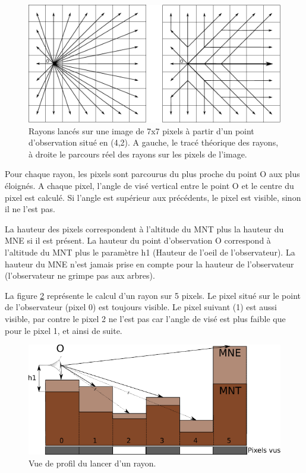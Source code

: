 \documentclass{report}
\begin{document}
\begin{figure}[H]
	\includegraphics[scale=0.8]{img/grid.pdf} 
	\caption{Rayons lancés sur une image de 7x7 pixels à partir d'un point d'observation situé en (4,2). A gauche, le tracé théorique des rayons, à droite le parcours réel des rayons sur les pixels de l'image.}
	\label{grid}
\end{figure}

Pour chaque rayon, les pixels sont parcourus du plus proche du point O aux plus éloignés. A chaque pixel, l'angle de visé vertical entre le point O et le centre du pixel est calculé. Si l'angle est supérieur aux précédents, le pixel est visible, sinon il ne l'est pas. 

La hauteur des pixels correspondent à l'altitude du MNT plus la hauteur du MNE si il est présent. La hauteur du point d'observation O correspond à l'altitude du MNT plus le paramètre h1 (Hauteur de l'oeil de l'observateur). La hauteur du MNE n'est jamais prise en compte pour la hauteur de l'observateur (l'observateur ne grimpe pas aux arbres).

La figure \ref{ray_side} représente le calcul d'un rayon sur 5 pixels. Le pixel situé sur le point de l'observateur (pixel 0) est toujours visible. Le pixel suivant (1) est aussi visible, par contre le pixel 2 ne l'est pas car l'angle de visé est plus faible que pour le pixel 1, et ainsi de suite.

\begin{figure}[H]
	\includegraphics{img/ray_side-fr.pdf} 
	\caption{Vue de profil du lancer d'un rayon.}
	\label{ray_side}
\end{figure}
\end{document}
